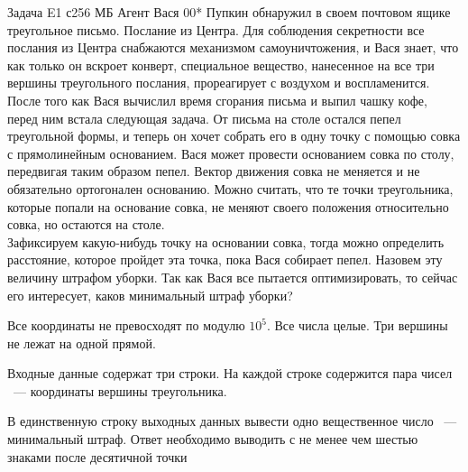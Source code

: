 \begin{problem}{Задача E}{1 с}{256 МБ}
Агент Вася 00* Пупкин  обнаружил в своем почтовом ящике треугольное
письмо. Послание из Центра. Для соблюдения секретности все послания из Центра
снабжаются механизмом самоуничтожения, и Вася знает, что как только он вскроет
конверт, специальное вещество, нанесенное на все три вершины треугольного
послания, прореагирует с воздухом и воспламенится.\\
После того как Вася вычислил время сгорания письма и выпил чашку кофе,
перед ним встала следующая задача. От письма на столе остался
пепел треугольной формы, и теперь он хочет собрать его в одну точку
с помощью совка с прямолинейным основанием. Вася может провести
основанием совка по столу, передвигая таким образом пепел.
Вектор движения совка не меняется и не обязательно ортогонален основанию.
Можно считать, что те точки треугольника, которые попали на основание совка,
не меняют своего положения относительно совка, но остаются на столе.\\
Зафиксируем какую-нибудь точку на основании совка, тогда можно
определить расстояние, которое пройдет эта точка, пока Вася собирает пепел.
Назовем эту величину штрафом уборки.
Так как Вася все пытается оптимизировать, то сейчас его интересует, каков
минимальный штраф уборки?

\Limit

Все координаты не превосходят по модулю $10^5$.
Все числа целые.
Три вершины не лежат на одной прямой.

\InputFile
Входные данные содержат три строки. На каждой строке содержится пара чисел
~--- координаты вершины треугольника.

\OutputFile
В единственную строку выходных данных вывести одно вещественное число ~---
минимальный штраф. Ответ необходимо
выводить с не менее чем шестью знаками после десятичной точки

\Example
\begin{example}
\end{example}
\end{problem}
